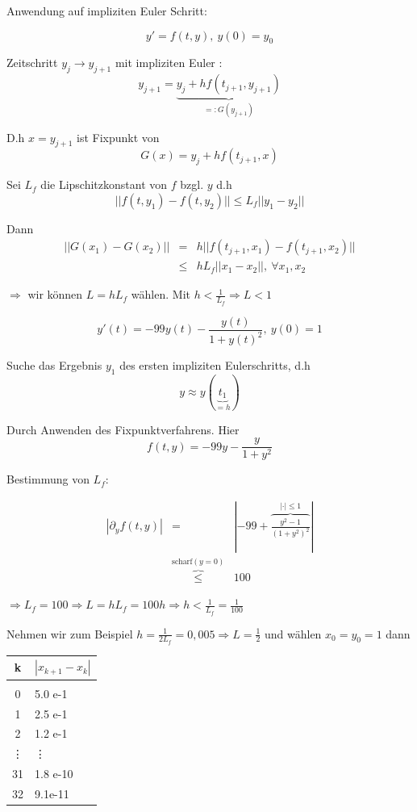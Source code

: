 \documentclass[10pt,a4paper]{article}
\begin{document}
\begin{bsp}



Anwendung auf impliziten Euler Schritt:

$$y'=f(t,y), ~ y(0)=y_0$$

Zeitschritt $y_j \rightarrow y_{j+1}$ mit impliziten Euler : $$y_{j+1}=\underbrace{y_j+hf(t_{j+1},y_{j+1})}_{=:G(y_{j+1})}$$


D.h $x=y_{j+1}$ ist Fixpunkt von $$G(x)=y_j+hf(t_{j+1},x)$$

Sei $L_f$ die Lipschitzkonstant von $f$ bzgl. $y$ d.h $$||f(t,y_1)-f(t,y_2)||\leq L_f ||y_1-y_2||$$

Dann 
\begin{eqnarray*}
||G(x_1)-G(x_2)||&=&h||f(t_{j+1},x_1)-f(t_{j+1},x_2)|| \\
& \leq & h L_f ||x_1-x_2||, ~ \forall x_1,x_2
\end{eqnarray*}

$\Rightarrow$ wir können $L=h L_f$ wählen. Mit $h < \frac{1}{L_f} \Rightarrow L < 1$

\end{bsp}

\begin{bsp}[Bestimme $L$ von $y'(t)=-99y(t)-\frac{y(t)}{1+y(t)^{2}}$]

$$y'(t)=-99y(t)-\frac{y(t)}{1+y(t)^{2}} , ~ y(0)=1$$

Suche das Ergebnis $y_1$ des ersten impliziten Eulerschritts, d.h $$y \approx y(\underbrace{t_1}_{=h})$$

Durch Anwenden des Fixpunktverfahrens. Hier $$f(t,y)=-99y-\frac{y}{1+y^{2}}$$

Bestimmung von $L_f$: 


\begin{eqnarray*}
|\partial_y f(t,y)| &=& |-99 + \overbrace{\frac{y^{2}-1}{(1+y^{2})^{2}}}^{|\cdot|\leq 1}| \\
&\overbrace{\leq}^{\text{scharf}(y=0)} & 100
\end{eqnarray*}


$\Rightarrow L_f = 100 \Rightarrow L = h L_f = 100h \Rightarrow h < \frac{1}{L_f}=\frac{1}{100}$

Nehmen wir zum Beispiel $h=\frac{1}{2 L_f}=0,005 \Rightarrow L=\frac{1}{2}$ und wählen $x_0=y_0=1$ dann

\begin{table}[H]
\centering
\begin{tabular}{c|l}
k & $|x_{k+1}-x_k|$ \\
\hline \\
0& 5.0 e-1\\
1& 2.5 e-1\\
2& 1.2 e-1\\
\vdots & \vdots \\
31& 1.8 e-10\\
32& 9.1e-11\\
\end{tabular}
\end{table}


\end{bsp}
\end{document}
